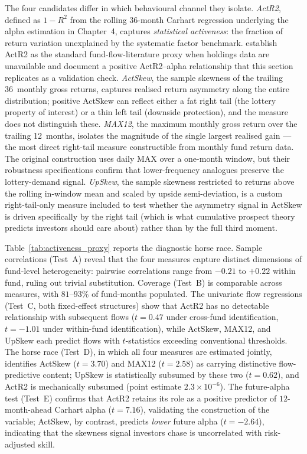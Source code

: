 \documentclass[12pt]{article}
\begin{document}
The four candidates differ in which behavioural channel they isolate.
\textit{ActR2}, defined as $1 - R^2$ from the rolling 36-month Carhart
regression underlying the alpha estimation in Chapter~4, captures
\textit{statistical activeness}: the fraction of return variation
unexplained by the systematic factor benchmark. \textcite{AmihudGoyenko2013}
establish ActR2 as the standard fund-flow-literature proxy when holdings
data are unavailable and document a positive ActR2--alpha relationship
that this section replicates as a validation check. \textit{ActSkew},
the sample skewness of the trailing 36~monthly gross returns, captures
realised return asymmetry along the entire distribution; positive
ActSkew can reflect either a fat right tail (the lottery property of
interest) or a thin left tail (downside protection), and the measure
does not distinguish these. \textit{MAX12}, the maximum monthly gross
return over the trailing 12~months, isolates the magnitude of the
single largest realised gain --- the most direct right-tail measure
constructible from monthly fund return data. The original
\textcite{ChengEtal2025} construction uses daily MAX over a one-month
window, but their robustness specifications confirm that lower-frequency
analogues preserve the lottery-demand signal. \textit{UpSkew}, the
sample skewness restricted to returns above the rolling in-window mean
and scaled by upside semi-deviation, is a custom right-tail-only
measure included to test whether the asymmetry signal in ActSkew is
driven specifically by the right tail (which is what cumulative
prospect theory predicts investors should care about) rather than by
the full third moment.

Table~\ref{tab:activeness_proxy} reports the diagnostic horse race.
Sample correlations (Test~A) reveal that the four measures capture
distinct dimensions of fund-level heterogeneity: pairwise correlations
range from $-0.21$ to $+0.22$ within fund, ruling out trivial
substitution. Coverage (Test~B) is comparable across measures, with
$81$--$93\%$ of fund-months populated. The univariate flow regressions
(Test~C, both fixed-effect structures) show that ActR2 has no
detectable relationship with subsequent flows ($t = 0.47$ under
cross-fund identification, $t = -1.01$ under within-fund
identification), while ActSkew, MAX12, and UpSkew each predict flows
with $t$-statistics exceeding conventional thresholds. The horse race
(Test~D), in which all four measures are estimated jointly, identifies
ActSkew ($t = 3.70$) and MAX12 ($t = 2.58$) as carrying distinctive
flow-predictive content; UpSkew is statistically subsumed by these two
($t = 0.62$), and ActR2 is mechanically subsumed (point estimate
$2.3 \times 10^{-6}$). The future-alpha test (Test~E) confirms that
ActR2 retains its \textcite{AmihudGoyenko2013} role as a positive
predictor of $12$-month-ahead Carhart alpha ($t = 7.16$), validating
the construction of the variable; ActSkew, by contrast, predicts
\textit{lower} future alpha ($t = -2.64$), indicating that the skewness
signal investors chase is uncorrelated with risk-adjusted skill.
\end{document}
